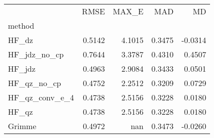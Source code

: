\begin{tabular}{lrrrr}
 & RMSE & MAX_E & MAD & MD \\
method &  &  &  &  \\
HF_dz & 0.5142 & 4.1015 & 0.3475 & -0.0314 \\
HF_jdz_no_cp & 0.7644 & 3.3787 & 0.4310 & 0.4507 \\
HF_jdz & 0.4963 & 2.9084 & 0.3433 & 0.0501 \\
HF_qz_no_cp & 0.4752 & 2.2512 & 0.3209 & 0.0729 \\
HF_qz_conv_e_4 & 0.4738 & 2.5156 & 0.3228 & 0.0180 \\
HF_qz & 0.4738 & 2.5156 & 0.3228 & 0.0180 \\
Grimme & 0.4972 & nan & 0.3473 & -0.0260 \\
\end{tabular}

